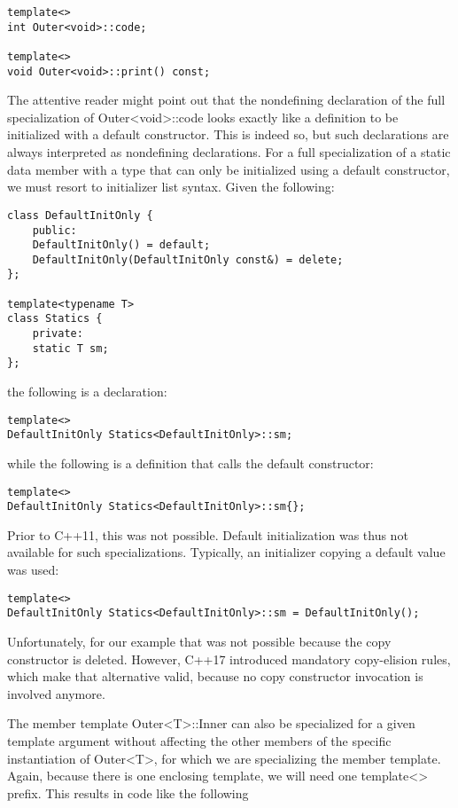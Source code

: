 \begin{lstlisting}[style=styleCXX]
template<>
int Outer<void>::code;

template<>
void Outer<void>::print() const;
\end{lstlisting}

The attentive reader might point out that the nondefining declaration of the full specialization of Outer<void>::code looks exactly like a definition to be initialized with a default constructor. This is indeed so, but such declarations are always interpreted as nondefining declarations. For a full specialization of a static data member with a type that can only be initialized using a default constructor, we must resort to initializer list syntax. Given the following:

\begin{lstlisting}[style=styleCXX]
class DefaultInitOnly {
	public:
	DefaultInitOnly() = default;
	DefaultInitOnly(DefaultInitOnly const&) = delete;
};

template<typename T>
class Statics {
	private:
	static T sm;
};
\end{lstlisting}

the following is a declaration:

\begin{lstlisting}[style=styleCXX]
template<>
DefaultInitOnly Statics<DefaultInitOnly>::sm;
\end{lstlisting}

while the following is a definition that calls the default constructor:

\begin{lstlisting}[style=styleCXX]
template<>
DefaultInitOnly Statics<DefaultInitOnly>::sm{};
\end{lstlisting}

Prior to C++11, this was not possible. Default initialization was thus not available for such specializations. Typically, an initializer copying a default value was used:

\begin{lstlisting}[style=styleCXX]
template<>
DefaultInitOnly Statics<DefaultInitOnly>::sm = DefaultInitOnly();
\end{lstlisting}

Unfortunately, for our example that was not possible because the copy constructor is deleted. However, C++17 introduced mandatory copy-elision rules, which make that alternative valid, because no copy constructor invocation is involved anymore.

The member template Outer<T>::Inner can also be specialized for a given template argument without affecting the other members of the specific instantiation of Outer<T>, for which we are specializing the member template. Again, because there is one enclosing template, we will need one template<> prefix. This results in code like the following

